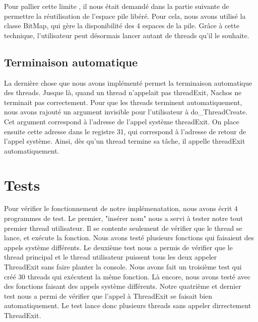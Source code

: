 \documentclass[12pt]{article}
\begin{document}
Pour pallier cette limite , il nous était demandé dans la partie suivante de permettre la réutilisation de l'espace pile libéré.
Pour cela, nous avons utilisé la classe BitMap, qui gère la disponibilité des 4 espaces de la pile.
Grâce à cette technique, l'utilisateur peut désormais lancer autant
de threads qu'il le souhaite.

\subsection{Terminaison automatique}
La dernière chose que nous avons implémenté permet la terminaison automatique des threads. Jusque là, quand un thread n'appelait pas threadExit, Nachos ne terminait pas correctement.
Pour que les threads terminent automatiquement, nous avons rajouté un argument invisible pour l'utilisateur à do\_ThreadCreate. Cet argument correspond à l'adresse de l'appel système threadExit.
On place ensuite cette adresse dans le registre 31, qui correspond à l'adresse de retour de l'appel système. Ainsi, dès qu'un thread termine sa tâche, il appelle threadExit automatiquement.

\section {Tests}

Pour vérifier le fonctionnement de notre implémenatation, nous avons écrit 4 programmes de test.
Le premier, "insérer nom" nous a servi à tester notre tout premier thread utilisateur. Il se contente seulement de vérifier que le thread se lance, et exécute la fonction. Nous avons testé plusieurs fonctions qui faisaient des appels système différents.
Le deuxième test nous a permis de vérifier que le thread principal et le thread utilisateur puissent tous les deux appeler ThreadExit sans faire planter la console.
Nous avons fait un troisième test qui créé 30 threads qui exécutent la même fonction. Là encore, nous avons testé avec des fonctions faisant des appels système différents.
Notre quatrième et dernier test nous a permi de vérifier que l'appel à ThreadExit se faisait bien automatiquement. Le test lance donc plusieurs threads sans appeler dirrectement ThreadExit.
\end{document}
